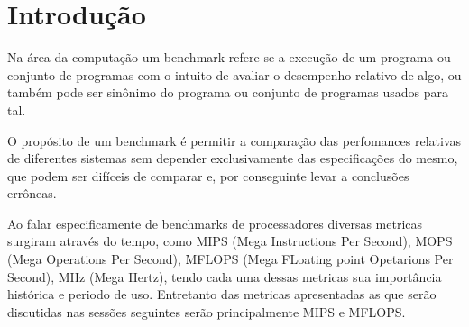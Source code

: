 
\section{Introdução}%
\label{sec:introduction}
Na área da computação um benchmark refere-se a execução de um programa ou conjunto de programas com o intuito de avaliar o desempenho relativo de algo, ou também pode ser sinônimo do programa ou conjunto de programas usados para tal.


O propósito de um benchmark é permitir a comparação das perfomances relativas de diferentes sistemas sem depender exclusivamente das especificações do mesmo, que podem ser difíceis de comparar e, por conseguinte levar a conclusões errôneas.

Ao falar especificamente de benchmarks de processadores diversas metricas surgiram através do tempo, como MIPS (Mega Instructions Per Second), MOPS (Mega Operations Per Second), MFLOPS (Mega FLoating point Opetarions Per Second), MHz (Mega Hertz), tendo cada uma dessas metricas sua importância histórica e periodo de uso. Entretanto das metricas apresentadas as que serão discutidas nas sessões seguintes serão principalmente MIPS e MFLOPS.

